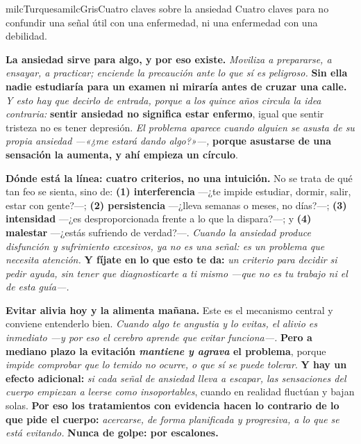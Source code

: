 \documentclass[11pt,letterpaper]{article}
\newcommand{\milcpaso}[3]{%
\Needspace{4\baselineskip}%
\begin{tcolorbox}[enhanced,colback=white,colframe=milcLinea,arc=1.5mm,boxrule=.9pt,
  left=14mm,right=4mm,top=3mm,bottom=3mm,before skip=4pt,after skip=4pt,
  fontupper=\RaggedRight,
  overlay={\node[anchor=north west,circle,fill=#2,text=white,inner sep=0pt,
    minimum size=7.4mm,font=\sffamily\bfseries\small]
    at ([xshift=3.6mm,yshift=-3.2mm]frame.north west) {#1};}]
#3
\end{tcolorbox}}
\begin{document}
\begin{softbox}{milcTurquesa}{milcGris}{Cuatro claves sobre la ansiedad}
Cuatro claves para no confundir una señal útil con una enfermedad, ni una enfermedad con una debilidad.
\end{softbox}

\milcpaso{1}{milcTurquesa}{\textbf{La ansiedad sirve para algo, y por eso existe.} \emph{Moviliza a prepararse, a ensayar, a practicar; enciende la precaución ante lo que sí es peligroso.} \textbf{Sin ella nadie estudiaría para un examen ni miraría antes de cruzar una calle.} \emph{Y esto hay que decirlo de entrada, porque a los quince años circula la idea contraria:} \textbf{sentir ansiedad no significa estar enfermo}, igual que sentir tristeza no es tener depresión. \emph{El problema aparece cuando alguien se asusta de su propia ansiedad ---«¿me estará dando algo?»---,} \textbf{porque asustarse de una sensación la aumenta, y ahí empieza un círculo}.}
\milcpaso{2}{milcTurquesa}{\textbf{Dónde está la línea: cuatro criterios, no una intuición.} No se trata de qué tan feo se sienta, sino de: \textbf{(1) interferencia} ---¿te impide estudiar, dormir, salir, estar con gente?---; \textbf{(2) persistencia} ---¿lleva semanas o meses, no días?---; \textbf{(3) intensidad} ---¿es desproporcionada frente a lo que la dispara?---; y \textbf{(4) malestar} ---¿estás sufriendo de verdad?---. \emph{Cuando la ansiedad produce disfunción y sufrimiento excesivos, ya no es una señal: es un problema que necesita atención.} \textbf{Y fíjate en lo que esto te da:} \emph{un criterio para decidir si pedir ayuda, sin tener que diagnosticarte a ti mismo ---que no es tu trabajo ni el de esta guía---.}}
\milcpaso{3}{milcTurquesa}{\textbf{Evitar alivia hoy y la alimenta mañana.} Este es el mecanismo central y conviene entenderlo bien. \emph{Cuando algo te angustia y lo evitas, el alivio es inmediato ---y por eso el cerebro aprende que evitar funciona---.} \textbf{Pero a mediano plazo la evitación \emph{mantiene y agrava} el problema}, porque \emph{impide comprobar que lo temido no ocurre, o que sí se puede tolerar}. \textbf{Y hay un efecto adicional:} \emph{si cada señal de ansiedad lleva a escapar, las sensaciones del cuerpo empiezan a leerse como insoportables}, cuando en realidad fluctúan y bajan solas. \textbf{Por eso los tratamientos con evidencia hacen lo contrario de lo que pide el cuerpo:} \emph{acercarse, de forma planificada y progresiva, a lo que se está evitando.} \textbf{Nunca de golpe: por escalones.}}
\end{document}
